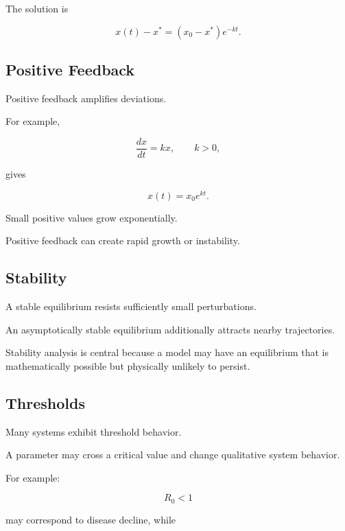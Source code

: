 The solution is

\[
\boxed{
x(t)-x^*
=
(x_0-x^*)e^{-kt}.
}
\]

\subsection{Positive Feedback}
\label{subsec:positive-feedback}

Positive feedback amplifies deviations.

For example,

\[
\boxed{
\frac{dx}{dt}
=
kx,
\qquad
k>0,
}
\]

gives

\[
x(t)=x_0e^{kt}.
\]

Small positive values grow exponentially.

Positive feedback can create rapid growth or instability.

\subsection{Stability}
\label{subsec:modeling-stability}

A stable equilibrium resists sufficiently small perturbations.

An asymptotically stable equilibrium additionally attracts nearby
trajectories.

Stability analysis is central because a model may have an equilibrium that
is mathematically possible but physically unlikely to persist.

\subsection{Thresholds}
\label{subsec:model-thresholds}

Many systems exhibit threshold behavior.

A parameter may cross a critical value and change qualitative system
behavior.

For example:

\[
\boxed{
R_0<1
}
\]

may correspond to disease decline, while

